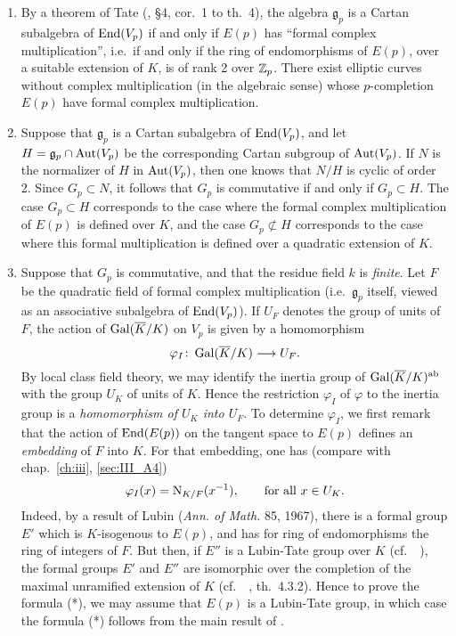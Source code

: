 \begin{subappendices}
\begin{obs}
\begin{enumerate}
	\item By a theorem of Tate (\cite{39}, \S4, cor.~1 to th.~4), the
		algebra $\mathfrak{g}_p$ is a Cartan subalgebra of $\operatorname{End}(V_p)$
		if and only if $E(p)$ has ``formal complex multiplication'',
		i.e.\ if and only if the ring of endomorphisms of $E(p)$, over
		a suitable extension of $K$, is of rank 2 over $\mathbb{Z}_p$. There
		exist elliptic curves without complex multiplication (in the
		algebraic sense) whose $p$-completion $E(p)$ have formal
		complex multiplication.
	\item Suppose that $\mathfrak{g}_p$ is a Cartan subalgebra of
		$\operatorname{End}(V_p)$, and let $H = \mathfrak{g}_p \cap \operatorname{Aut}(V_p)$ be the
		corresponding Cartan subgroup of $\operatorname{Aut}(V_p)$. If $N$ is the
		normalizer of $H$ in $\operatorname{Aut}(V_p)$, then one knows that $N/H$ is
		cyclic of order 2. Since $G_p \subset N$, it follows that $G_p$
		is commutative if and only if $G_p \subset H$. The case $G_p
		\subset H$ corresponds to the case where the formal complex
		multiplication of $E(p)$ is
		\dpage
		defined over $K$, and the case $G_p \not\subset H$ corresponds to
		the case where this formal multiplication is defined over a
		quadratic extension of $K$.
	\item Suppose that $G_p$ is commutative, and that the residue field $k$
		is \emph{finite}. Let $F$ be the quadratic field of formal
		complex multiplication (i.e.\ $\mathfrak{g}_p$ itself, viewed
		as an associative subalgebra of $\operatorname{End}(V_p)$). If $U_F$ denotes
		the group of units of $F$, the action of $\operatorname{Gal}(\overline{K}/K)$ on
		$V_p$ is given by a homomorphism
		\[
			\varphi_I \colon \operatorname{Gal}(\overline{K}/K) \longrightarrow U_F.
		\]
		By local class field theory, we may identify the inertia group
		of $\operatorname{Gal}(\overline{K}/K)^{\mathrm{ab}}$ with the group $U_K$ of units of
		$K$. Hence the restriction $\varphi_I$ of $\varphi$ to the
		inertia group is a \emph{homomorphism of $U_K$ into $U_F$}.  To
		determine $\varphi_I$, we first remark that the action of
		$\operatorname{End}(E(p))$ on the tangent space to $E(p)$ defines an
		\emph{embedding} of $F$ into $K$. For that embedding, one has
		(compare with chap.~\ref{ch:iii}, \ref{sec:III_A4})
		\[
			\varphi_I(x) = \operatorname{N}_{K/F}(x^{-1}), \qquad \text{for
				all } x\in U_K.
		\]
		Indeed, by a result of Lubin (\emph{Ann. of Math.} 85, 1967),
		there is a formal group $E'$ which is $K$-isogenous to $E(p)$,
		and has for ring of endomorphisms the ring of integers of $F$.
		But then, if $E''$ is a Lubin-Tate group over $K$ (cf.\
		\citeauthor{17}~\cite{17}), the formal groups $E'$ and $E''$
		are isomorphic over the completion of the maximal unramified
		extension of $K$ (cf.\ \citeauthor{16}~\cite{16}, th.~4.3.2).
		Hence to prove the formula (*),
		we may assume that $E(p)$ is a
		Lubin-Tate group, in which case the formula (*) follows from
		the main result of \cite{17}.
\end{enumerate}
\end{obs}


\end{subappendices}
